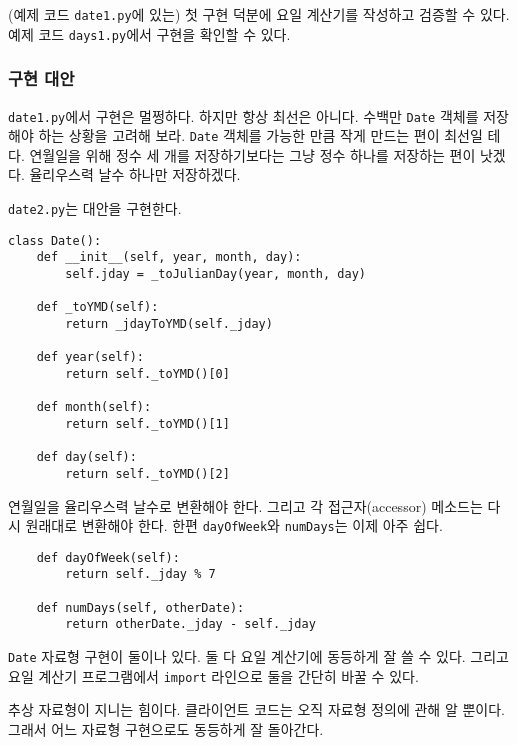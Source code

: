 \documentclass[a4paper]{oblivoir}
\begin{document}
(예제 코드 \texttt{date1.py}에 있는) 첫 구현 덕분에 요일 계산기를 작성하고 검증할 수 있다. 예제 코드 \texttt{days1.py}에서 구현을 확인할 수 있다.

\subsubsection*{구현 대안}

\texttt{date1.py}에서 구현은 멀쩡하다. 하지만 항상 최선은 아니다. 수백만 \texttt{Date} 객체를 저장해야 하는 상황을 고려해 보라. \texttt{Date} 객체를 가능한 만큼 작게 만드는 편이 최선일 테다. 연월일을 위해 정수 세 개를 저장하기보다는 그냥 정수 하나를 저장하는 편이 낫겠다. 율리우스력 날수 하나만 저장하겠다.

\texttt{date2.py}는 대안을 구현한다.

\begin{verbatim}
class Date():
    def __init__(self, year, month, day):
        self.jday = _toJulianDay(year, month, day)
        
    def _toYMD(self):
        return _jdayToYMD(self._jday)
        
    def year(self):
        return self._toYMD()[0]
        
    def month(self):
        return self._toYMD()[1]
        
    def day(self):
        return self._toYMD()[2]
\end{verbatim}

 연월일을 율리우스력 날수로 변환해야 한다. 그리고 각 접근자(accessor) 메소드는 다시 원래대로 변환해야 한다. 한편 \texttt{dayOfWeek}와 \texttt{numDays}는 이제 아주 쉽다.

\begin{verbatim}
    def dayOfWeek(self):
        return self._jday % 7
    
    def numDays(self, otherDate):
        return otherDate._jday - self._jday
\end{verbatim}

\texttt{Date} 자료형 구현이 둘이나 있다. 둘 다 요일 계산기에 동등하게 잘 쓸 수 있다. 그리고 요일 계산기 프로그램에서 \texttt{import} 라인으로 둘을 간단히 바꿀 수 있다.

추상 자료형이 지니는 힘이다. 클라이언트 코드는 오직 자료형 정의에 관해 알 뿐이다. 그래서 어느 자료형 구현으로도 동등하게 잘 돌아간다.
\end{document}

